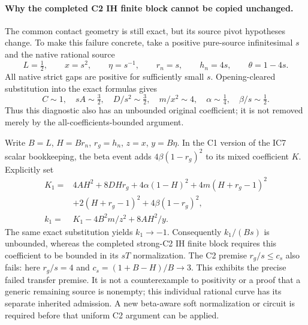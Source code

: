 \paragraph{Why the completed C2 IH finite block cannot be copied unchanged.}
The common contact geometry is still exact, but its source pivot
hypotheses change. To make this failure concrete, take a positive
pure-source infinitesimal $s$ and the native rational source
\[
 L=\tfrac12,\qquad x=s^2,\qquad\eta=s^{-1},\qquad
 r_n=s,\qquad h_n=4s,\qquad\theta=1-4s.              \tag{LH5}
\]
All native strict gaps are positive for sufficiently small $s$.
Opening-cleared substitution into the exact formulas gives
\[
 C\sim1,\quad sA\sim\tfrac32,\quad
 D/s^2\sim\tfrac32,\quad m/x^2\sim4,\quad
 \alpha\sim\tfrac14,\quad\beta/s\sim\tfrac12.       \tag{LH6}
\]
Thus this diagnostic also has an unbounded original coefficient;
it is not removed merely by the all-coefficients-bounded argument.

Write $B=L$, $H=Br_n$, $r_g=h_n$, $z=x$, $y=B\eta$.
In the C1 version of the IC7 scalar bookkeeping, the beta event
adds $4\beta(1-r_g)^2$ to its mixed coefficient $K$. Explicitly set
\[
\begin{split}
 K_1={}&4AH^2+8DHr_g+4\alpha(1-H)^2
       +4m(H+r_g-1)^2\\
       &+2(H+r_g-1)^2+4\beta(1-r_g)^2,\\
 k_1={}&K_1-4B^2m/z^2+8AH^2/y.
\end{split}                                                   \tag{LH7}
\]
The same exact substitution yields $k_1\to-1$. Consequently
$k_1/(Bs)$ is unbounded, whereas the completed strong-C2 IH
finite block requires this coefficient to be bounded in its
$sT$ normalization. The C2 premise $r_g/s\le c_s$ also fails:
here $r_g/s=4$ and $c_s=(1+B-H)/B\to3$.
This exhibits the precise failed transfer premise. It is not a
counterexample to positivity or a proof that a generic remaining
source is nonempty; this individual rational curve has its separate
inherited admission. A new beta-aware soft normalization or circuit
is required before that uniform C2 argument can be applied.
